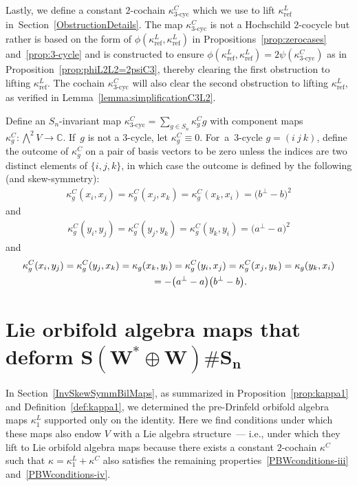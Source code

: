 \documentclass[10pt,a4paper]{amsart}
\numberwithin{equation}{section}
\DeclareMathOperator{\refl}{ref}
\DeclareMathOperator{\tri}{3-cyc}
\begin{document}
Lastly, we define a constant $2$-cochain $\kappa^C_{\tri}$ which we use to lift $\kappa^L_{\refl}$ in~Section~\ref{ObstructionDetails}. The map $\kappa^C_{\tri}$ is not a Hochschild $2$-cocycle but rather is
based on the form of $\phi(\kappa^L_{\refl},\kappa^L_{\refl})$ in Propositions~\ref{prop:zerocases} and~\ref{prop:3-cycle} and is constructed to ensure $\phi(\kappa^L_{\refl},\kappa^L_{\refl})=2\psi(\kappa^C_{\tri})$ as in
Proposition~\ref{prop:phiL2L2=2psiC3}, thereby
clearing the first obstruction to lifting $\kappa^L_{\refl}$. The cochain $\kappa^C_{\tri}$ will also clear the second obstruction to lifting $\kappa^L_{\refl}$, as verified in Lemma~\ref{lemma:simplificationC3L2}.

\begin{Definition}\label{def:kappatri}
Define an $S_n$-invariant map $\kappa^C_{\tri}=\sum_{g\in S_n}\kappa^C_gg$ with component maps $\kappa^C_{g}\colon \bigwedge^2 V\to \mathbb{C}$. If~$g$ is not a $3$-cycle, let $\kappa^C_g\equiv 0$. For~a~$3$-cycle $g=(i~j~k)$, define the outcome of $\kappa_{g}^C$ on a pair of basis vectors to be zero unless the indices are two distinct elements of $\{i,j,k\}$, in which case the outcome is defined by the following (and skew-symmetry):
\begin{gather*}
\kappa_{g}^C(x_i,x_j)=\kappa_{g}^C(x_j,x_k)=\kappa_{g}^C(x_k,x_i)=\big(b^{\perp}-b\big)^2
\end{gather*}
and
\begin{gather*}
\kappa_{g}^C(y_i,y_j)=\kappa_{g}^C(y_j,y_k)=\kappa_{g}^C(y_k,y_i)=\big(a^{\perp}-a\big)^2
\end{gather*}
and
\begin{gather*}
\kappa_{g}^C(x_i,y_j)=\kappa_{g}^C(y_j,x_k)=\kappa_{g}(x_k,y_i)
=\kappa_{g}^C(y_i,x_j)=\kappa_{g}^C(x_j,y_k)=\kappa_{g}(y_k,x_i)
\\ \hphantom{\kappa_{g}^C(x_i,y_j)}
{}=-\big(a^{\perp}-a\big)\big(b^{\perp}-b\big).
\end{gather*}
\end{Definition}

\section[Lie orbifold algebra maps that deform S(W* + W)Sn]
{Lie orbifold algebra maps that deform $\boldsymbol{S(W^* \oplus W)\# S_n}$}\label{InvLieBrackets}

In Section~\ref{InvSkewSymmBilMaps}, as summarized in Proposition~\ref{prop:kappa1} and Definition~\ref{def:kappa1},
we determined the
pre-Drinfeld orbifold algebra maps $\kappa^L_1$ supported only on the identity.
Here we find conditions under which these maps also endow
$V$ with a Lie algebra structure~--- i.e., under which they lift to Lie orbifold
algebra maps because there exists a constant $2$-cochain $\kappa^C$
such that $\kappa=\kappa^L_1+\kappa^C$ also satisfies the remaining
properties~\eqref{PBWconditions-iii} and~\eqref{PBWconditions-iv}.
\end{document}
